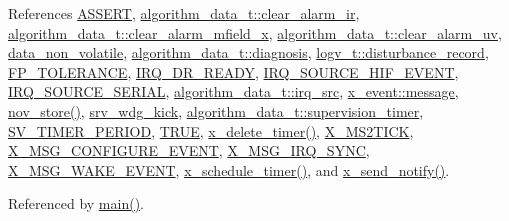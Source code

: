 References \hyperlink{a00072_source_l00059}{A\+S\+S\+E\+R\+T}, \hyperlink{a00016_source_l00049}{algorithm\+\_\+data\+\_\+t\+::clear\+\_\+alarm\+\_\+ir}, \hyperlink{a00016_source_l00055}{algorithm\+\_\+data\+\_\+t\+::clear\+\_\+alarm\+\_\+mfield\+\_\+x}, \hyperlink{a00016_source_l00052}{algorithm\+\_\+data\+\_\+t\+::clear\+\_\+alarm\+\_\+uv}, \hyperlink{a00060_source_l00016}{data\+\_\+non\+\_\+volatile}, \hyperlink{a00016_a16f85d57ec98b4ad05f5a2e10536b3c6}{algorithm\+\_\+data\+\_\+t\+::diagnosis}, \hyperlink{a00021_a11ed024c2cc5c53c79b2c0a8b35e3c06}{logv\+\_\+t\+::disturbance\+\_\+record}, \hyperlink{a00017_source_l00025}{F\+P\+\_\+\+T\+O\+L\+E\+R\+A\+N\+C\+E}, \hyperlink{a00021_source_l00064}{I\+R\+Q\+\_\+\+D\+R\+\_\+\+R\+E\+A\+D\+Y}, \hyperlink{a00021_source_l00063}{I\+R\+Q\+\_\+\+S\+O\+U\+R\+C\+E\+\_\+\+H\+I\+F\+\_\+\+E\+V\+E\+N\+T}, \hyperlink{a00021_source_l00058}{I\+R\+Q\+\_\+\+S\+O\+U\+R\+C\+E\+\_\+\+S\+E\+R\+I\+A\+L}, \hyperlink{a00016_a1aafd556b3c9ed3e5295b17dbd80cab8}{algorithm\+\_\+data\+\_\+t\+::irq\+\_\+src}, \hyperlink{a00036_source_l00064}{x\+\_\+event\+::message}, \hyperlink{a00060_source_l00397}{nov\+\_\+store()}, \hyperlink{a00067_source_l00028}{srv\+\_\+wdg\+\_\+kick}, \hyperlink{a00016_source_l00045}{algorithm\+\_\+data\+\_\+t\+::supervision\+\_\+timer}, \hyperlink{a00023_source_l00020}{S\+V\+\_\+\+T\+I\+M\+E\+R\+\_\+\+P\+E\+R\+I\+O\+D}, \hyperlink{a00040_source_l00084}{T\+R\+U\+E}, \hyperlink{a00037_source_l00482}{x\+\_\+delete\+\_\+timer()}, \hyperlink{a00036_source_l00048}{X\+\_\+\+M\+S2\+T\+I\+C\+K}, \hyperlink{a00016_source_l00023}{X\+\_\+\+M\+S\+G\+\_\+\+C\+O\+N\+F\+I\+G\+U\+R\+E\+\_\+\+E\+V\+E\+N\+T}, \hyperlink{a00036_source_l00020}{X\+\_\+\+M\+S\+G\+\_\+\+I\+R\+Q\+\_\+\+S\+Y\+N\+C}, \hyperlink{a00016_source_l00020}{X\+\_\+\+M\+S\+G\+\_\+\+W\+A\+K\+E\+\_\+\+E\+V\+E\+N\+T}, \hyperlink{a00037_source_l00456}{x\+\_\+schedule\+\_\+timer()}, and \hyperlink{a00037_source_l00435}{x\+\_\+send\+\_\+notify()}.



Referenced by \hyperlink{a00048_source_l00080}{main()}.


